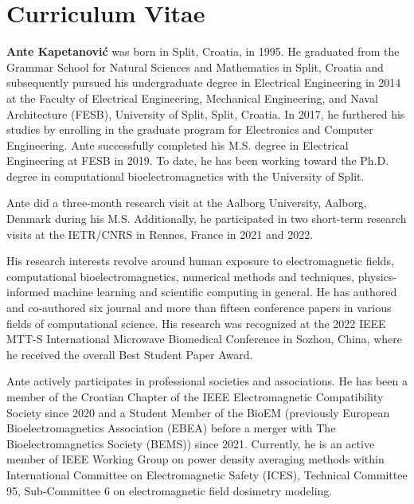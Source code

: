 \cleardoublepage
\pagestyle{empty}

\section*{Curriculum Vitae}
\vspace{15mm}
\noindent \textbf{Ante Kapetanović} was born in Split, Croatia, in 1995.
He graduated from the Grammar School for Natural Sciences and Mathematics in Split, Croatia and subsequently pursued his undergraduate degree in Electrical Engineering in 2014 at the Faculty of Electrical Engineering, Mechanical Engineering, and Naval Architecture (FESB), University of Split, Split, Croatia.
In 2017, he furthered his studies by enrolling in the graduate program for Electronics and Computer Engineering.
Ante successfully completed his M.S. degree in Electrical Engineering at FESB in 2019.
To date, he has been working toward the Ph.D. degree in computational bioelectromagnetics with the University of Split.

Ante did a three-month research visit at the Aalborg University, Aalborg, Denmark during his M.S.
Additionally, he participated in two short-term research visits at the IETR/CNRS in Rennes, France in 2021 and 2022.

His research interests revolve around human exposure to electromagnetic fields, computational bioelectromagnetics, numerical methods and techniques, physics-informed machine learning and scientific computing in general.
He has authored and co-authored six journal and more than fifteen conference papers in various fields of computational science.
His research was recognized at the 2022 IEEE MTT-S International Microwave Biomedical Conference in Sozhou, China, where he received the overall Best Student Paper Award.

Ante actively participates in professional societies and associations.
He has been a member of the Croatian Chapter of the IEEE Electromagnetic Compatibility Society since 2020 and a Student Member of the BioEM (previously European Bioelectromagnetics Association (EBEA) before a merger with The Bioelectromagnetics Society (BEMS)) since 2021.
Currently, he is an active member of IEEE Working Group on power density averaging methods within International Committee on Electromagnetic Safety (ICES), Technical Committee 95, Sub-Committee 6 on electromagnetic field dosimetry modeling.

\cleardoublepage
\pagestyle{empty}
